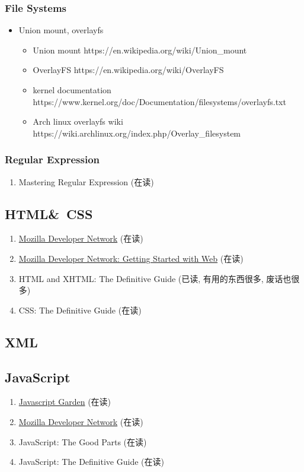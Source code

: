 \documentclass{article}
\begin{document}
\subsubsection{File Systems}
%
\begin{itemize}
    \item Union mount, overlayfs
        \begin{itemize}
            \item Union mount https://en.wikipedia.org/wiki/Union_mount
            \item OverlayFS https://en.wikipedia.org/wiki/OverlayFS
            \item kernel documentation https://www.kernel.org/doc/Documentation/filesystems/overlayfs.txt
            \item Arch linux overlayfs wiki https://wiki.archlinux.org/index.php/Overlay_filesystem
        \end{itemize}
\end{itemize}
\subsubsection{Regular Expression}
\begin{enumerate}
    \item Mastering Regular Expression (在读)
\end{enumerate}
\subsection{HTML\&\ CSS}
\begin{enumerate}
    \item \href{https://developer.mozilla.org/en-US/Learn}{Mozilla Developer Network} (在读)
    \item \href{https://developer.mozilla.org/en-US/Learn/Getting_started_with_the_web}{Mozilla Developer Network: Getting Started with Web} (在读)
    \item HTML and XHTML: The Definitive Guide (已读, 有用的东西很多, 废话也很多)
    \item CSS: The Definitive Guide (在读)
\end{enumerate}
%
\subsection{XML}
%
\subsection{JavaScript}
\begin{enumerate}
    \item  \href{http://bonsaiden.github.io/JavaScript-Garden/}{Javascript Garden} (在读)
    \item \href{https://developer.mozilla.org/en-US/Learn}{Mozilla Developer Network} (在读)
    \item JavaScript: The Good Parts (在读)
    \item JavaScript: The Definitive Guide (在读)
\end{enumerate}
\end{document}
